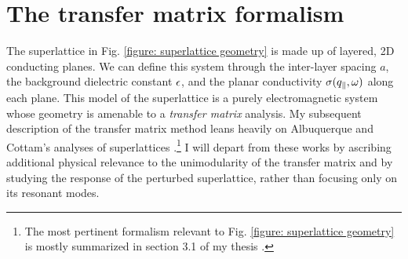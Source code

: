 \section{The transfer matrix formalism}

The superlattice in Fig. \ref{figure: superlattice geometry} is made up of layered, 2D conducting planes.  We can define this system through the inter-layer spacing $a$, the background dielectric constant $\epsilon$, and the planar conductivity $\sigma(q_{\parallel},\omega)$ along each plane.  This model of the superlattice is a purely electromagnetic system whose geometry is amenable to a {\it transfer matrix} analysis.  My subsequent description of the transfer matrix method leans heavily on Albuquerque and Cottam's analyses of superlattices \cite{Cottam1993,Cottam2004}.\footnote{The most pertinent formalism relevant to Fig. \ref{figure: superlattice geometry} is mostly summarized in section 3.1 of my thesis \cite{Boyd2021}.}  I will depart from these works by ascribing additional physical relevance to the unimodularity of the transfer matrix and by studying the response of the perturbed superlattice, rather than focusing only on its resonant modes.


